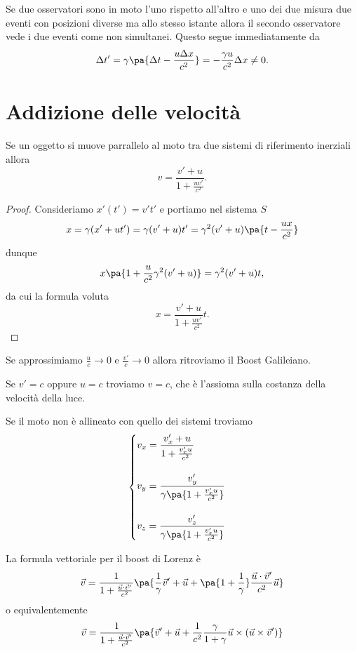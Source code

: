 \begin{example}
Se due osservatori sono in moto l'uno rispetto all'altro e uno dei due misura due eventi con posizioni diverse ma allo stesso istante allora il secondo osservatore vede i due eventi come non simultanei. Questo segue immediatamente da
\[\Delta t'=\gamma\pa{\Delta t-\frac{u\Delta x}{c^2}}=-\frac{\gamma u}{c^2} \Delta x\neq 0.\]
\end{example}



\section{Addizione delle velocit\`a}
\begin{proposition}\label{FormulaBoost}
Se un oggetto si muove parrallelo al moto tra due sistemi di riferimento inerziali allora
\[v=\dfrac{v'+u}{\displaystyle 1+\frac{uv'}{c^2}}.\]
\end{proposition}
\begin{proof}
Consideriamo $x'(t')=v't'$ e portiamo nel sistema $S$
\[x=\gamma(x'+ut')=\gamma(v'+u)t'=\gamma^2(v'+u)\pa{t-\frac{ux}{c^2}}\]
dunque
\[x\pa{1+\frac u{c^2}\gamma^2(v'+u)}=\gamma^2(v'+u)t,\]
da cui la formula voluta
\[x=\frac{v'+u}{1+\frac{uv'}{c^2}}t.\]
\end{proof}

\begin{remark}
Se approssimiamo $\frac{u}{c}\to 0$ e $\frac{v'}{c}\to 0$ allora ritroviamo il Boost Galileiano.
\end{remark}

\begin{remark}
Se $v'=c$ oppure $u=c$ troviamo $v=c$, che \`e l'assioma sulla costanza della velocit\`a della luce.
\end{remark}

\begin{remark}
Se il moto non \`e allineato con quello dei sistemi troviamo
\[\begin{cases}
v_x=\dfrac{v_x'+u}{1+\frac{v_x' u}{c^2}}\\\\
v_y=\dfrac{v_y'}{\gamma\pa{1+\frac{v_x' u}{c^2}}}\\\\
v_z=\dfrac{v_z'}{\gamma\pa{1+\frac{v_x' u}{c^2}}}
\end{cases}\]
\end{remark}

\noindent La formula vettoriale per il boost di Lorenz \`e
\[\vec v=\frac1{1+\frac{\vec u\cdot \vec v'}{c^2}}\pa{\frac1\gamma \vec v'+\vec u+\pa{1+\frac1\gamma}\frac{\vec u\cdot \vec v'}{c^2}\vec u}\]
o equivalentemente
\[\vec v=\frac1{1+\frac{\vec u\cdot \vec v'}{c^2}}\pa{\vec v'+\vec u+\frac1{c^2}\frac{\gamma}{1+\gamma} \vec u\times (\vec u\times \vec v')}\]


